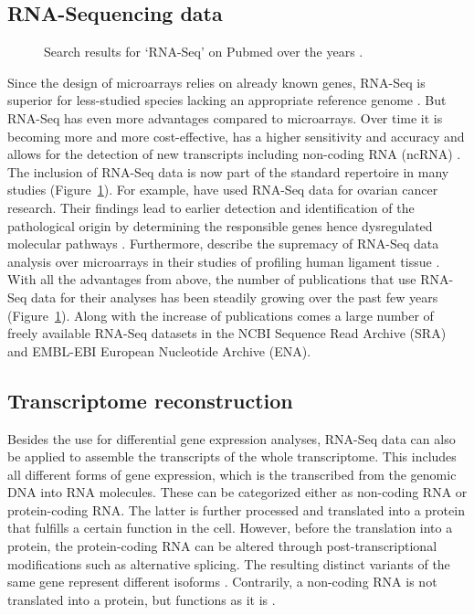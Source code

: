 \documentclass[12pt,a4paper,english]{article}
\begin{document}
	\subsection{RNA-Sequencing data}
	\begin{figure}
		\centering
		\def\svgwidth{0.6\textwidth}
		\vspace{-20pt}
		
		\caption[Search results for `RNA-Seq']{Search results for `RNA-Seq' on Pubmed over the years \citep{growth}.}
		\label{img:growth}
	\end{figure}

    Since the design of microarrays relies on already known genes, RNA-Seq is superior for less-studied species lacking an appropriate reference genome \citep{Wang:09}. But RNA-Seq has even more advantages compared to microarrays. Over time it is becoming more and more cost-effective, has a higher sensitivity and accuracy and allows for the detection of new transcripts including non-coding RNA (ncRNA) \citep{Rodriguez-Garcia:17}.
	The inclusion of RNA-Seq data is now part of the standard repertoire in many studies (Figure~\ref{img:growth}). For example, \citeauthor{Wang:19} have used RNA-Seq data for ovarian cancer research. Their findings lead to earlier detection and identification of the pathological origin by determining the responsible genes hence dysregulated molecular pathways \citep{Wang:19}.
	Furthermore, \citeauthor{Rai:18} describe the supremacy of RNA-Seq data analysis over microarrays in their studies of profiling human ligament tissue \citep{Rai:18}.
	With all the advantages from above, the number of publications that use RNA-Seq data for their analyses has been steadily growing over the past few years (Figure~\ref{img:growth}). Along with the increase of publications comes a large number of freely available RNA-Seq datasets in the NCBI Sequence Read Archive (SRA) and EMBL-EBI European Nucleotide Archive (ENA).


\subsection{Transcriptome reconstruction}
    Besides the use for differential gene expression analyses, RNA-Seq data can also be applied to assemble the transcripts of the whole transcriptome.
    This includes all different forms of gene expression, which is the transcribed from the genomic DNA into RNA molecules. These can be categorized either as non-coding RNA or protein-coding RNA. The latter is further processed and translated into a protein that fulfills a certain function in the cell. However, before the translation into a protein, the protein-coding RNA can be altered through post-transcriptional modifications such as alternative splicing. The resulting distinct variants of the same gene represent different isoforms \citep{splicing:03}. Contrarily, a non-coding RNA is not translated into a protein, but functions as it is \citep{ncRNA:05}.
    
\end{document}
